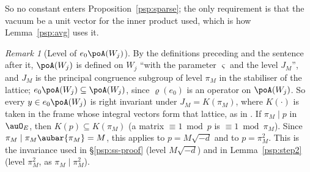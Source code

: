\documentclass[10pt]{amsart}
\theoremstyle{definition}
\theoremstyle{remark}
\newtheorem{remark}[theorem]{Remark}
\begin{document}
\noindent So no constant enters
Proposition~\ref{psp:sparse}; the only requirement is that the vacuum be a unit vector for the inner
product used, which is how Lemma~\ref{psp:avg} uses it.

\begin{remark}[Level of $e_0\poA(W_j)$]\label{psq:level}
By the definitions preceding {\cite[Definition~14.6]{P46}} and the sentence after it, $\poA(W_j)$
is defined on $W_j$ ``with the parameter $\varsigma$ and the level $J_M$'', and $J_M$ is the principal
congruence subgroup of level $\pi_M$ in the stabiliser of the lattice; $e_0\poA(W_j)\subseteq
\poA(W_j)$, since $\varrho(e_0)$ is an operator on $\poA(W_j)$. So every $y\in e_0\poA(W_j)$ is right
invariant under $J_M=K(\pi_M)$, where $K(\cdot)$ is taken in the frame whose integral vectors form that
lattice, as in {\cite[Definition~3.27]{P53}}. If $\pi_M\mid p$ in $\auO_E$, then $K(p)\subseteq
K(\pi_M)$ (a matrix $\equiv1\bmod p$ is $\equiv1\bmod\pi_M$). Since $\pi_M\mid\pi_M\aubar{\pi_M}=M$, this
applies to $p=M\sqrt{-d}$ and to $p=\pi_M^2$. This is the invariance used in \S\ref{psp:ss-proof} (level $M\sqrt{-d}$) and in Lemma~\ref{psp:step2}
(level $\pi_M^2$, as $\pi_M\mid\pi_M^2$).
\end{remark}
\end{document}
